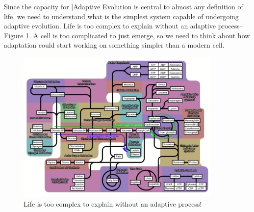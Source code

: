 \documentclass[]{article}
\begin{document}
Since the capacity for ]Adaptive Evolution is central to almost any definition of life, we need to understand what is the simplest system capable of undergoing adaptive evolution. Life is too complex to explain without an adaptive
process--Figure \ref{fig:LifeTooComplex}\cite{hoyle1983intelligent}. A cell is too complicated to  just emerge, so we need to think about how adaptation could start working on something simpler than a modern cell.

\begin{figure}[H]
	\caption{Life is too complex to explain without an adaptive
		process!}\label{fig:LifeTooComplex}
	\includegraphics[width=0.9\textwidth]{LifeTooComplex}
\end{figure}
\end{document}

